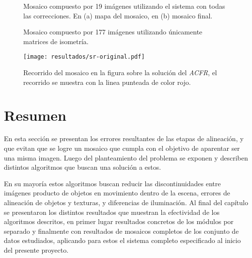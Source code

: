 \begin{figure}[H]
	\centering     
	
	\hspace{10mm}%
	\caption[Mosaico del conjunto \textit{Espenky}]{Mosaico compuesto por 19 imágenes utilizando el sistema con todas las correcciones. En (a) mapa del mosaico, en (b) mosaico final.}
	\label{imagen:full:espenky}
\end{figure}

\begin{figure}[H]
	\centering     
	
	\hspace{10mm}%
	
	\caption[Mosaico del conjunto \textit{ScottReef 25}]{Mosaico compuesto por 177 imágenes utilizando únicamente matrices de isometría.}
	\label{imagen:full:SR2}
\end{figure}

\begin{figure}[H]
	\centering
	\texttt{[image: resultados/sr-original.pdf]}
	\caption[Mosaico del conjunto \textit{ScottReef 25} por el \textit{ACFR}]{Recorrido del mosaico en la figura sobre la solución del \textit{ACFR}, el recorrido se muestra con la linea punteada de color rojo.}
	\label{imagen:full:SR-original}
\end{figure}

\section{Resumen}

En esta sección se presentan los errores resultantes de las etapas de alineación, y que evitan que se logre un  mosaico que cumpla con el objetivo de aparentar ser una misma imagen. Luego del planteamiento del problema se exponen y describen distintos algoritmos que buscan una solución a estos.

En su mayoría estos algoritmos buscan reducir las discontinuidades entre imágenes producto de objetos en movimiento dentro de la escena, errores de alineación de objetos y texturas, y diferencias de iluminación. Al final del capítulo se presentaron los distintos resultados que muestran la efectividad de los algoritmos descritos, en primer lugar resultados concretos de los módulos por separado y finalmente con resultados de mosaicos completos de los conjunto de datos estudiados, aplicando para estos el sistema completo especificado al inicio del presente proyecto.

